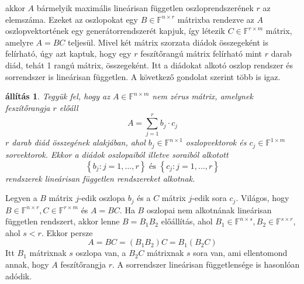 \documentclass[a4paper, showtrims]{memoir}
\makeatletter
\renewenvironment{proof}[1][\proofname]
    {\par\pushQED{\qed}%
    \normalfont \topsep6\p@\@plus6\p@\relax
    \trivlist
    \item[\hskip\labelsep
        \itshape
    #1\@addpunct{:}]\ignorespaces}
    {\popQED\endtrivlist\@endpefalse}
\theoremstyle{plain}
\newtheorem{proposition}{állítás}[chapter]
\theoremstyle{remark}
\theoremstyle{definition}
\makeatother
\begin{document}
akkor $A$ bármelyik maximális lineárisan független oszloprendszerének $r$ az elemszáma.
Ezeket az oszlopokat egy $B\in\mathbb{F}^{n\times r}$ mátrixba rendezve az $A$ oszlopvektortének
egy generátorrendszerét kapjuk,
így létezik $C\in\mathbb{F}^{r\times m}$ mátrix, amelyre $A=BC$ teljesül.
Mivel két mátrix szorzata diádok összegeként is felírható, 
úgy azt kaptuk, hogy egy $r$ feszítőrangú mátrix felírható mint $r$ darab diád,
tehát 1 rangú mátrix, összegeként.
Itt a diádokat alkotó oszlop rendszer és sorrendszer is lineárisan független.
A következő gondolat szerint több is igaz.
\begin{proposition}
	Tegyük fel, hogy az $A\in\mathbb{F}^{n\times m}$ nem zérus mátrix, 
    amelynek feszítőrangja $r$ előáll
	\[
		A=\sum_{j=1}^rb_j\cdot c_j
	\]
	$r$ darab diád összegének alakjában,
    ahol $b_j\in\mathbb{F}^{n\times 1}$ oszlopvektorok és $c_j\in\mathbb{F}^{1\times m}$ sorvektorok.
	Ekkor a diádok oszlopaiból illetve soraiból alkotott
	\[
		\left\{ b_j:j=1,\ldots,r \right\} \text{ és }
		\left\{ c_j:j=1,\ldots,r \right\}
	\]
	rendszerek lineárisan független rendszereket alkotnak.
\end{proposition}
\begin{proof}
	Legyen a $B$ mátrix $j$-edik oszlopa $b_j$ és a $C$ mátrix $j$-edik sora $c_j$.
	Világos, hogy $B\in\mathbb{F}^{n\times r}, C\in\mathbb{F}^{r\times m}$ és
	$A=BC$.
	Ha $B$ oszlopai nem alkotnának lineárisan független rendszert, akkor
	lenne $B=B_1B_2$ előállítás,
	ahol $B_1\in\mathbb{F}^{n\times s}, B_2\in\mathbb{F}^{s\times r}$,
	ahol $s<r$.
	Ekkor persze
	\[
		A=BC=\left( B_1B_2 \right)C=B_1\left( B_2C \right)
	\]
	Itt $B_1$ mátrixnak $s$ oszlopa van, a
	$B_2C$ mátrixnak $s$ sora van,
	ami ellentomond annak, hogy $A$ feszítőrangja $r$.
	A sorrendszer lineárisan függetlensége is hasonlóan adódik.
\end{proof}
\end{document}
